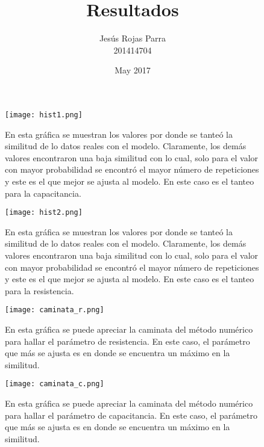 \documentclass{article}
\title{Resultados}
\author{Jesús Rojas Parra \\ 201414704 }
\date{May 2017}
\begin{document}
\maketitle

\section*{}

\subsection*{}


\begin{figure}[H]
\centering
\texttt{[image: hist1.png]}
\caption{En esta gráfica se muestran los valores por donde se tanteó la similitud de lo datos reales con el modelo. Claramente, los demás valores encontraron una baja similitud con lo cual, solo para el valor con mayor probabilidad se encontró el mayor número de repeticiones y este es el que mejor se ajusta al modelo. En este caso es el tanteo para la capacitancia. }
\label{hist1}
\end{figure}


\begin{figure}[H]
\centering
\texttt{[image: hist2.png]}
\caption{En esta gráfica se muestran los valores por donde se tanteó la similitud de lo datos reales con el modelo. Claramente, los demás valores encontraron una baja similitud con lo cual, solo para el valor con mayor probabilidad se encontró el mayor número de repeticiones y este es el que mejor se ajusta al modelo. En este caso es el tanteo para la resistencia.}
\label{hist2}
\end{figure}

\begin{figure}[H]
\centering
\texttt{[image: caminata\_r.png]}
\caption{En esta gráfica se puede apreciar la caminata del método numérico para hallar el parámetro de resistencia. En este caso, el parámetro que más se ajusta es en donde se encuentra un máximo en la similitud.}
\label{caminatar}
\end{figure}

\begin{figure}[H]
\centering
\texttt{[image: caminata\_c.png]}
\caption{En esta gráfica se puede apreciar la caminata del método numérico para hallar el parámetro de capacitancia. En este caso, el parámetro que más se ajusta es en donde se encuentra un máximo en la similitud.}
\label{caminatac}
\end{figure}
\end{document}
